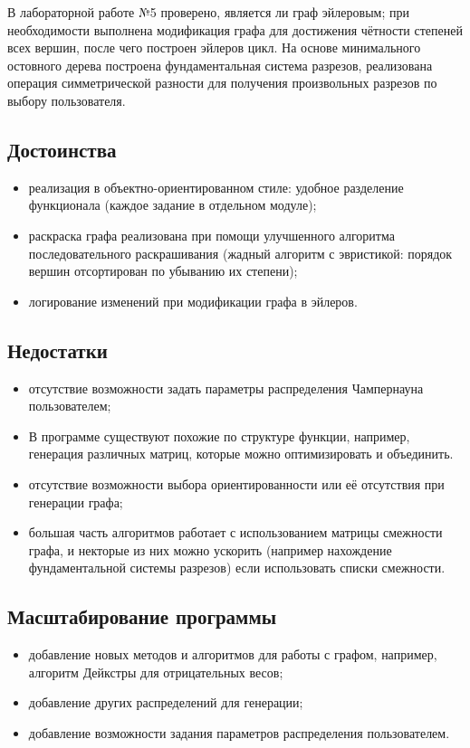 В лабораторной работе №5 проверено, является ли граф эйлеровым; при необходимости выполнена модификация графа для достижения чётности степеней всех вершин, после чего построен эйлеров цикл. На основе минимального остовного дерева построена фундаментальная система разрезов, реализована операция симметрической разности для получения произвольных разрезов по выбору пользователя.

\subsection*{Достоинства}
\begin{itemize}
	\item реализация в объектно-ориентированном стиле: удобное разделение функционала (каждое задание в отдельном модуле);
	\item раскраска графа реализована при помощи улучшенного алгоритма последовательного раскрашивания (жадный алгоритм с эвристикой: порядок вершин отсортирован по убыванию их степени);
	\item логирование изменений при модификации графа в эйлеров.
\end{itemize}

\subsection*{Недостатки}
\begin{itemize}
	\item отсутствие возможности задать параметры распределения Чампернауна пользователем;
	\item В программе существуют похожие по структуре функции, например, генерация различных матриц, которые можно оптимизировать и объединить.
	\item отсутствие возможности выбора ориентированности или её отсутствия при генерации графа;
	\item большая часть алгоритмов работает с использованием матрицы смежности графа, и некторые из них можно ускорить (например нахождение фундаментальной системы разрезов) если использовать списки смежности.
\end{itemize}

\subsection*{Масштабирование программы}
\begin{itemize}
	\item добавление новых методов и алгоритмов для работы с графом, например, алгоритм Дейкстры для отрицательных весов;
	\item добавление других распределений для генерации;
	\item добавление возможности задания параметров распределения пользователем.
\end{itemize}